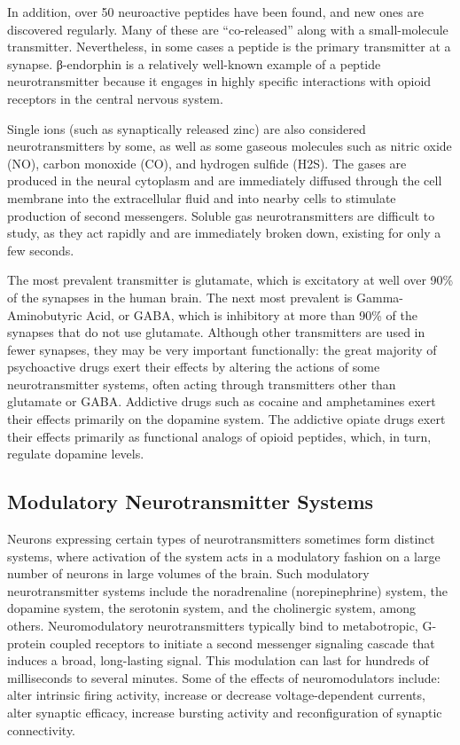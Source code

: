 In addition, over 50 neuroactive peptides have been found, and new ones are discovered regularly. Many of these are ``co-released'' along with a small-molecule transmitter. Nevertheless, in some cases a peptide is the primary transmitter at a synapse. β-endorphin is a relatively well-known example of a peptide neurotransmitter because it engages in highly specific interactions with opioid receptors in the central nervous system.

Single ions (such as synaptically released zinc) are also considered neurotransmitters by some, as well as some gaseous molecules such as nitric oxide (NO), carbon monoxide (CO), and hydrogen sulfide (H2S). The gases are produced in the neural cytoplasm and are immediately diffused through the cell membrane into the extracellular fluid and into nearby cells to stimulate production of second messengers. Soluble gas neurotransmitters are difficult to study, as they act rapidly and are immediately broken down, existing for only a few seconds.

The most prevalent transmitter is glutamate, which is excitatory at well over 90\% of the synapses in the human brain. The next most prevalent is Gamma-Aminobutyric Acid, or GABA, which is inhibitory at more than 90\% of the synapses that do not use glutamate. Although other transmitters are used in fewer synapses, they may be very important functionally: the great majority of psychoactive drugs exert their effects by altering the actions of some neurotransmitter systems, often acting through transmitters other than glutamate or GABA. Addictive drugs such as cocaine and amphetamines exert their effects primarily on the dopamine system. The addictive opiate drugs exert their effects primarily as functional analogs of opioid peptides, which, in turn, regulate dopamine levels.

\hypertarget{modulatory-neurotransmitter-systems}{%
\subsection{Modulatory Neurotransmitter Systems}\label{modulatory-neurotransmitter-systems}}

Neurons expressing certain types of neurotransmitters sometimes form distinct systems, where activation of the system acts in a modulatory fashion on a large number of neurons in large volumes of the brain. Such modulatory neurotransmitter systems include the noradrenaline (norepinephrine) system, the dopamine system, the serotonin system, and the cholinergic system, among others. Neuromodulatory neurotransmitters typically bind to metabotropic, G-protein coupled receptors to initiate a second messenger signaling cascade that induces a broad, long-lasting signal. This modulation can last for hundreds of milliseconds to several minutes. Some of the effects of neuromodulators include: alter intrinsic firing activity, increase or decrease voltage-dependent currents, alter synaptic efficacy, increase bursting activity and reconfiguration of synaptic connectivity.

